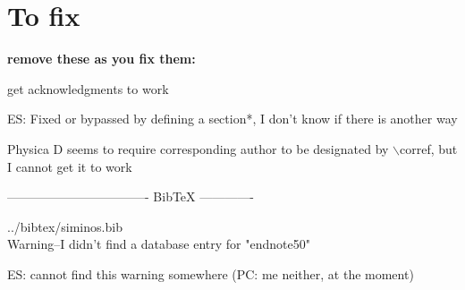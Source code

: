 
\section*{To fix}

{\bf remove these as you fix them:}


get 
acknowledgments to work

ES: Fixed or bypassed by defining a section*, I don't know if there is another way

Physica D seems to require corresponding author to be designated by $\backslash$corref, but I cannot get it to work

---------------------------------- BibTeX -------------

../bibtex/siminos.bib
\\
Warning--I didn't find a database entry for "endnote50"

ES: cannot find this warning somewhere 
(PC: me neither, at the moment)
